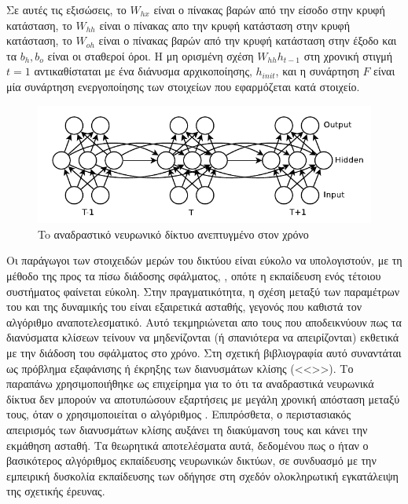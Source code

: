 Σε αυτές τις εξισώσεις, το $W_{hx}$ είναι ο πίνακας βαρών από την είσοδο στην κρυφή κατάσταση, το $W_{hh}$ είναι ο πίνακας απο την κρυφή κατάσταση στην κρυφή κατάσταση, το $W_{oh}$ είναι ο πίνακας βαρών από την κρυφή κατάσταση στην έξοδο και τα $b_h, b_o$ είναι οι σταθεροί όροι.
Η μη ορισμένη σχέση $W_{hh}h_{t-1}$ στη χρονική στιγμή $t = 1$ αντικαθίσταται με ένα διάνυσμα αρχικοποίησης, $h_{init}$, και η συνάρτηση $F$ είναι μία συνάρτηση ενεργοποίησης των στοιχείων που εφαρμόζεται κατά στοιχείο.

\begin{figure}[tph]
	\includegraphics[width=\textwidth, keepaspectratio]{images/rnn.png}
	\centering 
	\caption{To αναδραστικό νευρωνικό δίκτυο ανεπτυγμένο στον χρόνο}
	\label{fig:rnn}
\end{figure}

Οι παράγωγοι των στοιχειδών μερών του δικτύου είναι εύκολο να υπολογιστούν, με τη μέθοδο της προς τα πίσω διάδοσης σφάλματος, \cite{Graves2013}, οπότε η εκπαίδευση ενός τέτοιου συστήματος φαίνεται εύκολη.
Στην πραγματικότητα, η σχέση μεταξύ των παραμέτρων του  και της δυναμικής του είναι εξαιρετικά ασταθής, γεγονός που καθιστά τον αλγόριθμο  αναποτελεσματικό.
Αυτό τεκμηριώνεται απο τους  \cite{Pascanu2012} που αποδεικνύουν πως τα διανύσματα κλίσεων τείνουν να μηδενίζονται (ή σπανιότερα να απειρίζονται) εκθετικά με την διάδοση του σφάλματος στο χρόνο.
Στη σχετική βιβλιογραφία αυτό συναντάται ως πρόβλημα εξαφάνισης ή έκρηξης των διανυσμάτων κλίσης (<<>>).
Το παραπάνω χρησιμοποιήθηκε ως επιχείρημα για το ότι τα αναδραστικά νευρωνικά δίκτυα δεν μπορούν να αποτυπώσουν εξαρτήσεις με μεγάλη χρονική απόσταση μεταξύ τους, όταν ο χρησιμοποιείται ο αλγόριθμος .
Επιπρόσθετα, ο περιστασιακός απειρισμός των διανυσμάτων κλίσης αυξάνει τη διακύμανση τους και κάνει την εκμάθηση ασταθή.
Τα θεωρητικά αποτελέσματα αυτά, δεδομένου πως ο  ήταν ο βασικότερος αλγόριθμος εκπαίδευσης νευρωνικών δικτύων, σε συνδυασμό με την εμπειρική δυσκολία εκπαίδευσης των  οδήγησε στη σχεδόν ολοκληρωτική εγκατάλειψη της σχετικής έρευνας.

